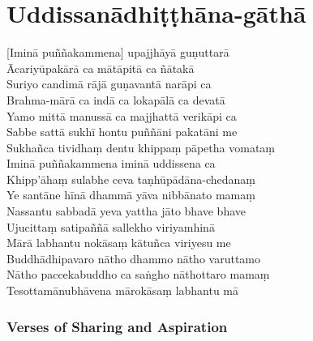 \section{Uddissanādhiṭṭhāna-gāthā}

\begin{leader}
\end{leader}


[Iminā puññakammena] upajjhāyā guṇuttarā\\
Ācariyūpakārā ca mātāpitā ca ñātakā\\
Suriyo candimā rājā guṇavantā narāpi ca\\
Brahma-mārā ca indā ca lokapālā ca devatā\\
Yamo mittā manussā ca majjhattā verikāpi ca\\
Sabbe sattā sukhī hontu puññāni pakatāni me\\
Sukhañca tividhaṃ dentu khippaṃ pāpetha vomataṃ\\
Iminā puññakammena iminā uddissena ca\\
Khipp'āhaṃ sulabhe ceva taṇhūpādāna-chedanaṃ\\
Ye santāne hīnā dhammā yāva nibbānato mamaṃ\\
Nassantu sabbadā yeva yattha jāto bhave bhave\\
Ujucittaṃ satipaññā sallekho viriyamhinā\\
Mārā labhantu nokāsaṃ kātuñca viriyesu me\\
Buddhādhipavaro nātho dhammo nātho varuttamo\\
Nātho paccekabuddho ca saṅgho nāthottaro mamaṃ\\
Tesottamānubhāvena mārokāsaṃ labhantu mā

\subsubsection{Verses of Sharing and Aspiration}

\begin{leader}
\end{leader}


